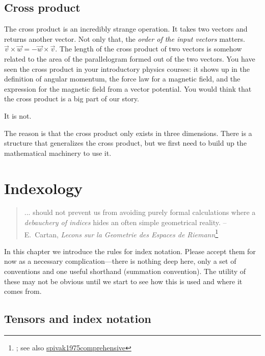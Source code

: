 \documentclass[12pt, oneside]{report}    %
\let\oldsection\section
\def\section{%
  \setcounter{sidenote}{1}%
  \oldsection
}
\begin{document}
\begin{subappendices}
\section{Cross product}

The cross product is an incredibly strange operation. It takes two vectors and returns another vector. Not only that, the \emph{order of the input vectors} matters. $\vec{v}\times\vec{w} = -\vec{w}\times\vec{v}$. The length of the cross product of two vectors is somehow related to the area of the parallelogram formed out of the two vectors. You have seen the cross product in your introductory physics courses: it shows up in the definition of angular momentum, the force law for a magnetic field, and the expression for the magnetic field from a vector potential. You would think that the cross product is a big part of our story. 

It is not.

The reason is that the cross product only exists in three dimensions. There is a structure that generalizes the cross product, but we first need to build up the mathematical machinery to use it. 



\end{subappendices}



\chapter{Indexology}\label{ch:indexology}
\begin{quote}
... should not prevent us from avoiding purely formal calculations where a \emph{debauchery of indices} hides an often simple geometrical reality. -- E.~Cartan, \emph{Lecons sur la Geometrie des Espaces de Riemann}\footnote{\cite{spivak1975comprehensive}; see also \url{spivak1975comprehensive}}
\end{quote} %

In this chapter we introduce the rules for index notation. Please accept them for now as a necessary complication---there is nothing deep here, only a set of conventions and one useful shorthand (summation convention). The utility of these may not be obvious until we start to see how this is used and where it comes from.

\section{Tensors and index notation}
\label{sec:index:notation}
\end{document}

